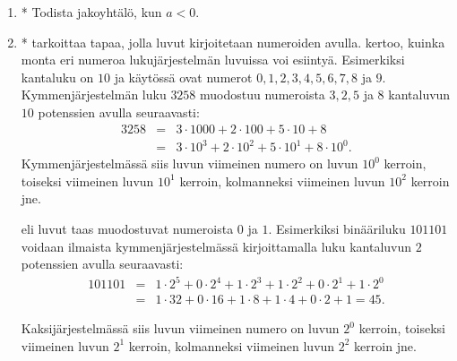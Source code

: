 \begin{enumerate}
\item * %
Todista jakoyhtälö, kun $a<0$.

\item *
 tarkoittaa tapaa, jolla luvut kirjoitetaan numeroiden avulla.  kertoo, kuinka monta eri numeroa lukujärjestelmän luvuissa voi esiintyä. Esimerkiksi  kantaluku on $10$ ja käytössä ovat numerot $0, 1, 2, 3, 4, 5, 6, 7, 8$ ja $9$. Kymmenjärjestelmän luku $3258$ muodostuu numeroista $3, 2, 5$ ja $8$ kantaluvun $10$ potenssien avulla seuraavasti:
\begin{eqnarray*}
3258 &=&3\cdot 1000+2\cdot 100+5\cdot 10+8\\
&=& 3\cdot 10^3+2\cdot 10^2+5\cdot 10^1+8\cdot 10^0.
\end{eqnarray*}
Kymmenjärjestelmässä siis luvun viimeinen numero on luvun $10^0$ kerroin, toiseksi viimeinen luvun $10^1$ kerroin, kolmanneksi viimeinen luvun $10^2$ kerroin jne.

 eli  luvut taas muodostuvat numeroista $0$ ja $1$. Esimerkiksi binääriluku $101101$ voidaan ilmaista kymmenjärjestelmässä kirjoittamalla luku kantaluvun $2$ potenssien avulla seuraavasti:
\begin{eqnarray*}
101101&=&1\cdot2^5+0\cdot2^4+1\cdot2^3+1\cdot2^2+0\cdot2^1+1\cdot2^0 \\
&=& 1\cdot32+0\cdot16+1\cdot8+1\cdot4+0\cdot2+1=45.
\end{eqnarray*}

Kaksijärjestelmässä siis luvun viimeinen numero on luvun $2^0$ kerroin, toiseksi viimeinen luvun $2^1$ kerroin, kolmanneksi viimeinen luvun $2^2$ kerroin jne.


\end{enumerate}
